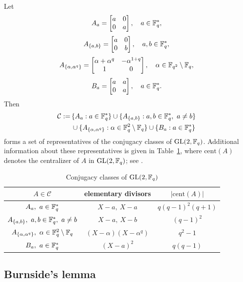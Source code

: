 \documentclass{amsart}
\numberwithin{equation}{section}
\theoremstyle{definition}
\newcommand{\f}{\Bbb F}
\begin{document}
Let 
\[
A_a=\left[\begin{matrix}a&0\cr 0&a\end{matrix}\right],\quad a\in\f_q^*,
\]
\[
A_{\{a,b\}}=\left[\begin{matrix}a&0\cr 0&b\end{matrix}\right],\quad a,b\in\f_q^*,
\]
\[
A_{\{\alpha,\alpha^q\}}=\left[\begin{matrix}\alpha+\alpha^q&-\alpha^{1+q}\cr 1&0\end{matrix}\right],\quad \alpha\in\f_{q^2}\setminus\f_q,
\]
\[
B_a=\left[\begin{matrix}a&a\cr 0&a\end{matrix}\right],\quad a\in\f_q^*.
\]
Then
\begin{align}\label{conj-cls}
\mathcal C:=\,&\{A_a:a\in\f_q^*\}\cup\{A_{\{a,b\}}:a,b\in\f_q^*,\ a\ne b\}\\
&\cup\{A_{\{\alpha,\alpha^q\}}:\alpha\in\f_q^2\setminus\f_q\}\cup\{B_a:a\in\f_q^*\}\nonumber
\end{align}
forms a set of representatives of the conjugacy classes of $\text{GL}(2,\f_q)$. Additional information about these representatives is given in Table~\ref{Tb1}, where $\text{cent}(A)$ denotes the centralizer of $A$ in $\text{GL}(2,\f_q)$; see \cite[\S 6.3]{Hou-ams-gsm-2018}.

\begin{table}[ht]
\caption{Conjugacy classes of $\text{GL}(2,\f_q)$}\label{Tb1}
   \renewcommand*{\arraystretch}{1.2}
    \centering
     \begin{tabular}{|c|c|c|}
         \hline
         $A\in\mathcal C$ & elementary divisors & $|\text{cent}(A)|$\\ \hline
         $A_a,\ a\in\f_q^*$ & $X-a,\ X-a$ &$q(q-1)^2(q+1)$ \\ \hline
         $A_{\{a,b\}},\ a,b\in\f_q^*,\ a\ne b$ & $X-a,\ X-b$ & $(q-1)^2$ \\ \hline
         $A_{\{\alpha,\alpha^q\}},\ \alpha\in\f_q^2\setminus\f_q$ & $(X-\alpha)(X-\alpha^q)$ & $q^2-1$ \\ \hline
         $B_a,\ a\in\f_q^*$ & $(X-a)^2$ & $q(q-1)$ \\ \hline
    \end{tabular}
\end{table}

\subsection{Burnside's lemma}\
\end{document}
